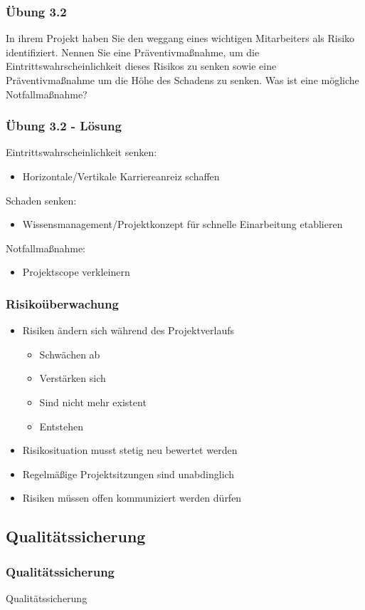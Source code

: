 \begin{frame}
\frametitle{Übung 3.2}
	In ihrem Projekt haben Sie den weggang eines wichtigen Mitarbeiters als Risiko identifiziert.
	Nennen Sie eine Präventivmaßnahme, um die Eintrittswahrscheinlichkeit dieses Risikos zu senken
	sowie eine Präventivmaßnahme um die Höhe des Schadens zu senken. Was ist eine mögliche
	Notfallmaßnahme?
\end{frame}

\ifloesung
\begin{frame}
\frametitle{Übung 3.2 - Lösung}
	Eintrittswahrscheinlichkeit senken:
	\begin{itemize}
		\item Horizontale/Vertikale Karriereanreiz schaffen
	\end{itemize}

	Schaden senken:
	\begin{itemize}
		\item Wissensmanagement/Projektkonzept für schnelle Einarbeitung etablieren
	\end{itemize}

	Notfallmaßnahme:
	\begin{itemize}
		\item Projektscope verkleinern
	\end{itemize}
\end{frame}
\fi

\begin{frame}
\frametitle{Risikoüberwachung}
	\begin{itemize}
		\item Risiken ändern sich während des Projektverlaufs
					\begin{itemize}
						\item Schwächen ab
						\item Verstärken sich
						\item Sind nicht mehr existent
						\item Entstehen
					\end{itemize}
		\item Risikosituation musst stetig neu bewertet werden
		\item Regelmäßige Projektsitzungen sind unabdinglich
		\item Risiken müssen offen kommuniziert werden dürfen
	\end{itemize}
\end{frame}

\subsection{Qualitätssicherung}
\begin{frame}
\frametitle{Qualitätssicherung}
\huge Qualitätssicherung
\end{frame}

